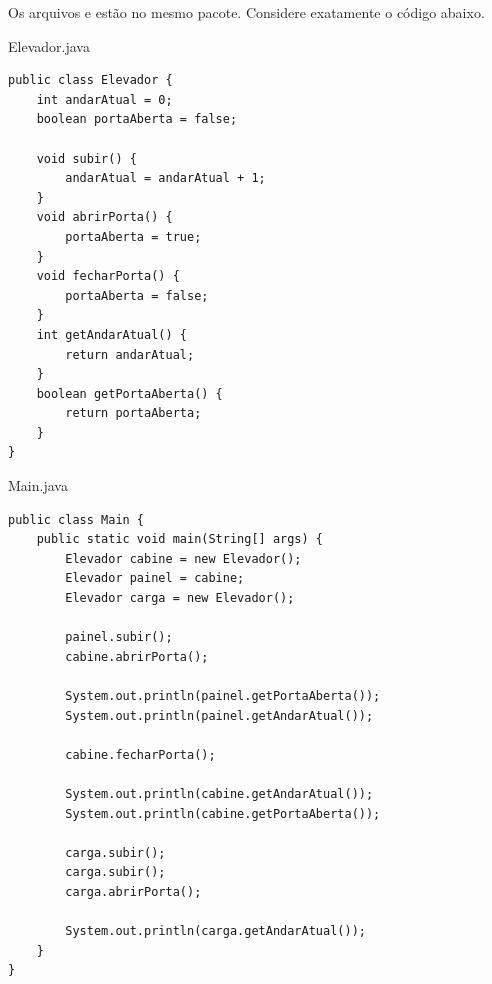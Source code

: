\documentclass[11pt,a4paper]{article}
\begin{document}
\cabecalhoAvaliacao
\blocoQuadroRespostas
{}
Os arquivos  e  estão no mesmo pacote.
Considere exatamente o código abaixo.

\noindent\begin{minipage}[t]{.37\textwidth}
\vspace{0pt}
\begin{painelreferencia}{Elevador.java}
\begin{lstlisting}[style=cenariocodigo]
public class Elevador {
    int andarAtual = 0;
    boolean portaAberta = false;

    void subir() {
        andarAtual = andarAtual + 1;
    }
    void abrirPorta() {
        portaAberta = true;
    }
    void fecharPorta() {
        portaAberta = false;
    }
    int getAndarAtual() {
        return andarAtual;
    }
    boolean getPortaAberta() {
        return portaAberta;
    }
}
\end{lstlisting}
\end{painelreferencia}
\end{minipage}\hfill
\begin{minipage}[t]{.61\textwidth}
\vspace{0pt}
\begin{painelreferencia}{Main.java}
\begin{lstlisting}[style=cenariocodigo]
public class Main {
    public static void main(String[] args) {
        Elevador cabine = new Elevador();
        Elevador painel = cabine;
        Elevador carga = new Elevador();

        painel.subir();
        cabine.abrirPorta();

        System.out.println(painel.getPortaAberta());
        System.out.println(painel.getAndarAtual());

        cabine.fecharPorta();

        System.out.println(cabine.getAndarAtual());
        System.out.println(cabine.getPortaAberta());

        carga.subir();
        carga.subir();
        carga.abrirPorta();

        System.out.println(carga.getAndarAtual());
    }
}
\end{lstlisting}
\end{painelreferencia}
\end{minipage}
\inicioQuestoes
\end{document}
